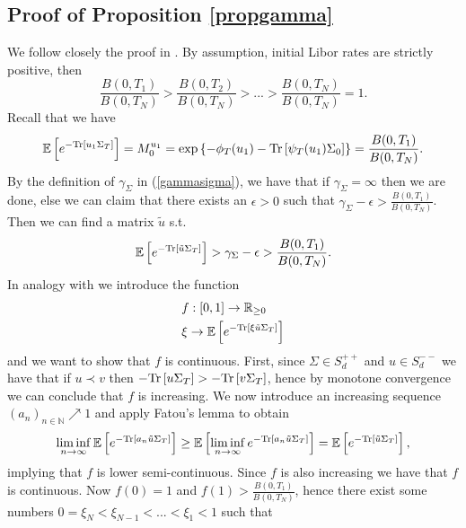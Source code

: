 \subsection*{Proof of Proposition \ref{propgamma}}
We follow closely the proof in \cite{article_KRPT2009}. By assumption, initial Libor rates are strictly positive, then
\begin{equation}
\frac{B(0,T_{1})}{B(0,T_{N})} > \frac{B(0,T_{2})}{B(0,T_{N})} > ... > \frac{B(0,T_{N})}{B(0,T_{N})}=1.
\end{equation}
Recall that we have
\begin{equation}
\mathbb{E}\left[ e^{-\textup{Tr}\left[u_1\Sigma_{T}\right]}\right]=M_{0}^{u_{1}}=\exp\left\{ -\phi_{T}(u_{1})-\textup{Tr}\left[\psi_{T}(u_{1})\Sigma_{0} \right]\right\}=\frac{B(0,T_{1})}{B(0,T_{N})}.
\end{equation}
By the definition of $\gamma_{\Sigma}$ in (\ref{gammasigma}), we have that if $\gamma_{\Sigma}=\infty$ then we are done, else we can claim that there exists an $\epsilon >0$ such that $\gamma_{\Sigma}-\epsilon > \frac{B(0,T_{1})}{B(0,T_{N})}$. Then we can find a matrix $ \tilde{u}$ s.t.
\begin{equation}
\mathbb{E}\left[ e^{-\textup{Tr}\left[\tilde{u}\Sigma_{T}\right]}\right]>\gamma_{\Sigma}-\epsilon > \frac{B(0,T_{1})}{B(0,T_{N})}.
\end{equation}
In analogy with \cite{article_KRPT2009} we introduce the function
\begin{align}
&f:\left[0,1\right]\rightarrow\mathbb{R}_{\geq 0}\nonumber\\
&\xi \rightarrow \mathbb{E}\left[ e^{-\textup{Tr}\left[\xi \tilde{u}\Sigma_{T}\right]}\right]
\end{align}
and we want to show that $f$ is continuous. First, since $\Sigma \in S_{d}^{++}$ and $u \in S_{d}^{--}$ we have that if $u \prec v$ then $-\textup{Tr}\left[u\Sigma_{T}\right]>-\textup{Tr}\left[v\Sigma_{T}\right]$, hence by monotone convergence we can conclude that $f$ is increasing. We now introduce an increasing sequence $(a_{n})_{n \in \mathbb{N}} \nearrow 1$ and apply Fatou's lemma to obtain
\begin{equation}
\liminf_{n \rightarrow \infty}\mathbb{E}\left[ e^{-\textup{Tr}\left[a_{n} \tilde{u}\Sigma_{T}\right]}\right] \geq
\mathbb{E}\left[\liminf_{n \rightarrow \infty} e^{-\textup{Tr}\left[a_{n} \tilde{u}\Sigma_{T}\right]}\right]=\mathbb{E}\left[ e^{-\textup{Tr}\left[\tilde{u}\Sigma_{T}\right]}\right],
\nonumber\end{equation}
implying that $f$ is lower semi-continuous. Since $f$ is also increasing we have that $f$ is continuous. Now $f(0)=1$ and $f(1)>\frac{B(0,T_{1})}{B(0,T_{N})}$, hence there exist some numbers $0= \xi_{N} < \xi_{N-1} < ... < \xi_{1}<1$ such that
